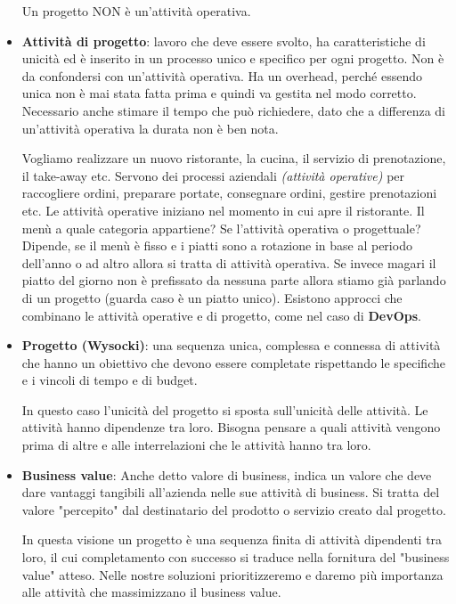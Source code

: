 \begin{itemize}
	\begin{warn}
		Un progetto NON è un'attività operativa.
	\end{warn}
	\item\textbf{Attività di progetto}: lavoro che deve essere svolto, ha caratteristiche di unicità ed è inserito in un processo unico e specifico per ogni progetto. Non è da confondersi con un'attività operativa. Ha un overhead, perché essendo unica non è mai stata fatta prima e quindi va gestita nel modo corretto. Necessario anche stimare il tempo che può richiedere, dato che a differenza di un'attività operativa la durata non è ben nota.
	\begin{info}
		Vogliamo realizzare un nuovo ristorante, la cucina, il servizio di prenotazione, il take-away etc.\newline
		Servono dei processi aziendali \textit{(attività operative)} per raccogliere ordini, preparare portate, consegnare ordini, gestire prenotazioni etc.\newline
		Le attività operative iniziano nel momento in cui apre il ristorante.\newline
		Il menù a quale categoria appartiene? Se l'attività operativa o progettuale? Dipende, se il menù è fisso e i piatti sono a rotazione in base al periodo dell'anno o ad altro allora si tratta di attività operativa. Se invece magari il piatto del giorno non è prefissato da nessuna parte allora stiamo già parlando di un progetto (guarda caso è un piatto unico).\newline
		Esistono approcci che combinano le attività operative e di progetto, come nel caso di \textbf{DevOps}.
	\end{info}
	\item \textbf{Progetto (Wysocki)}: una sequenza unica, complessa e connessa di attività che hanno un obiettivo che devono essere completate rispettando le specifiche e i vincoli di tempo e di budget.
	\begin{info}
		In questo caso l'unicità del progetto si sposta sull'unicità delle attività. Le attività hanno dipendenze tra loro. Bisogna pensare a quali attività vengono prima di altre e alle interrelazioni che le attività hanno tra loro.
	\end{info}
	\item \textbf{Business value}: Anche detto valore di business, indica un valore che deve dare vantaggi tangibili all'azienda nelle sue attività di business. Si tratta del valore "percepito" dal destinatario del prodotto o servizio creato dal progetto.
	\begin{info}
		In questa visione un progetto è una sequenza finita di attività dipendenti tra loro, il cui completamento con successo si traduce nella fornitura del "business value" atteso. Nelle nostre soluzioni prioritizzeremo e daremo più importanza alle attività che massimizzano il business value.
	\end{info}
\end{itemize}
